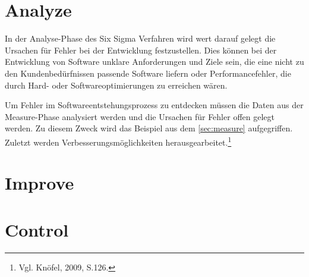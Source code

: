     \section{Analyze}
    
        
        In der Analyse-Phase des Six Sigma Verfahren wird wert darauf gelegt die Ursachen für Fehler bei der Entwicklung festzustellen. Dies können bei der Entwicklung von Software unklare Anforderungen und Ziele sein, die eine nicht zu den Kundenbedürfnissen passende Software liefern oder Performancefehler, die durch Hard- oder Softwareoptimierungen zu erreichen wären.
        
        Um Fehler im Softwareentstehungsprozess zu entdecken müssen die Daten aus der Measure-Phase analysiert werden und die Ursachen für Fehler offen gelegt werden. Zu diesem Zweck wird das Beispiel aus dem \autoref{sec:measure} aufgegriffen.
        Zuletzt werden Verbesserungsmöglichkeiten herausgearbeitet.\footnote{Vgl. Knöfel, 2009, S.126.}

    \section{Improve}

    \section{Control} 